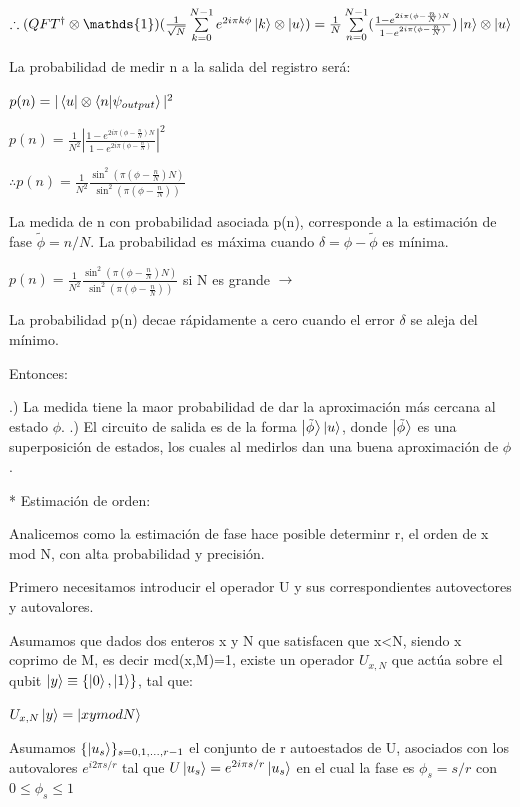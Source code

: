 \documentclass[11pt, spanish]{report}
\begin{document}
$\therefore (QFT^\dagger \otimes \mathds{1}) (\frac{1}{\sqrt{N}} \sum\limits_{k=0}^{N-1} e^{2 i \pi k \phi} \ket{k} \otimes \ket{u}) = \frac{1}{N} \sum\limits_{n=0}^{N-1} (\frac{1 - e^{2 i \pi (\phi - \frac{n}{N})N}}{1 - e^{2 i \pi (\phi - \frac{n}{N})}}) \ket{n} \otimes \ket{u}$

La probabilidad de medir n a la salida del registro será:

$p(n) = |\bra{u} \otimes \bra{n} \ket{\psi_{output}}|^2$

$p(n) = \frac{1}{N^2} |\frac{1 - e^{2 i \pi (\phi - \frac{n}{N})N}}{1 - e^{2 i \pi (\phi - \frac{n}{N})}}|^2$

$\therefore p(n) = \frac{1}{N^2} \frac{\sin^2(\pi (\phi - \frac{n}{N}) N)}{\sin^2(\pi (\phi - \frac{n}{N}))}$

La medida de n con probabilidad asociada p(n), corresponde a la estimación de fase $\tilde{\phi} = n/N$. La probabilidad es máxima cuando $\delta = \phi - \tilde{\phi}$ es mínima.

$p(n) = \frac{1}{N^2} \frac{\sin^2(\pi (\phi - \frac{n}{N}) N)}{\sin^2(\pi (\phi - \frac{n}{N}))}$ si N es grande $\rightarrow$ %

La probabilidad p(n) decae rápidamente a cero cuando el error $\delta$ se aleja del mínimo.

Entonces:

.) La medida tiene la maor probabilidad de dar la aproximación más cercana al estado $\phi$.
.) El circuito de salida es de la forma $\ket{\tilde{\phi}} \ket{u}$, donde $\ket{\tilde{\phi}}$ es una superposición de estados, los cuales al medirlos dan una buena aproximación de $\phi$.

* Estimación de orden:

Analicemos como la estimación de fase hace posible determinr r, el orden de x mod N, con alta probabilidad y precisión.

Primero necesitamos introducir el operador U y sus correspondientes autovectores y autovalores.

Asumamos que dados dos enteros x y N que satisfacen que x<N, siendo x coprimo de M, es decir mcd(x,M)=1, existe un operador $U_{x,N}$ que actúa sobre el qubit $\ket{y} \equiv \{\ket{0}, \ket{1}\}$, tal que:

$U_{x,N} \ket{y} = \ket{x y mod N}$

Asumamos $\{ \ket{u_s}\}_{s = 0, 1, ..., r-1}$ el conjunto de r autoestados de U, asociados con los autovalores $e^{i 2 \pi s/r}$ tal que $U \ket{u_s} = e^{2 i \pi s /r} \ket{u_s}$ en el cual la fase es $\phi_s = s/r$ con $0 \leq \phi_s \leq 1$
\end{document}
